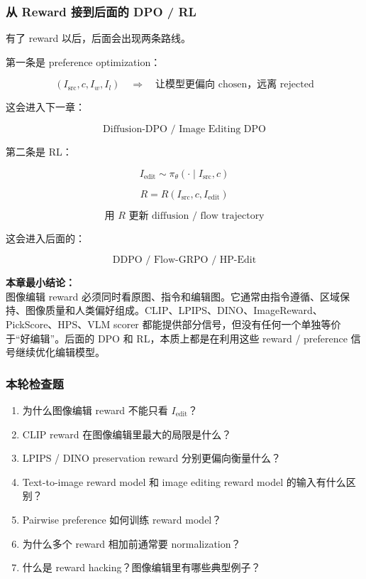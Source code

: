 \subsubsection{从 Reward 接到后面的 DPO / RL}

有了 reward 以后，后面会出现两条路线。

第一条是 preference optimization：

\[
(I_\text{src},c,I_w,I_l)
\quad\Rightarrow\quad
\text{让模型更偏向 chosen，远离 rejected}
\]

这会进入下一章：

\[
\text{Diffusion-DPO / Image Editing DPO}
\]

第二条是 RL：

\[
I_\text{edit}\sim\pi_\theta(\cdot\mid I_\text{src},c)
\]

\[
R=R(I_\text{src},c,I_\text{edit})
\]

\[
\text{用 } R \text{ 更新 diffusion / flow trajectory}
\]

这会进入后面的：

\[
\text{DDPO / Flow-GRPO / HP-Edit}
\]

\begin{summarybox}
\textbf{本章最小结论：}\\
图像编辑 reward 必须同时看原图、指令和编辑图。它通常由指令遵循、区域保持、图像质量和人类偏好组成。CLIP、LPIPS、DINO、ImageReward、PickScore、HPS、VLM scorer 都能提供部分信号，但没有任何一个单独等价于“好编辑”。后面的 DPO 和 RL，本质上都是在利用这些 reward / preference 信号继续优化编辑模型。
\end{summarybox}

\subsubsection{本轮检查题}

\begin{enumerate}[leftmargin=1.5em]
  \item 为什么图像编辑 reward 不能只看 $I_\text{edit}$？
  \item CLIP reward 在图像编辑里最大的局限是什么？
  \item LPIPS / DINO preservation reward 分别更偏向衡量什么？
  \item Text-to-image reward model 和 image editing reward model 的输入有什么区别？
  \item Pairwise preference 如何训练 reward model？
  \item 为什么多个 reward 相加前通常要 normalization？
  \item 什么是 reward hacking？图像编辑里有哪些典型例子？
\end{enumerate}
